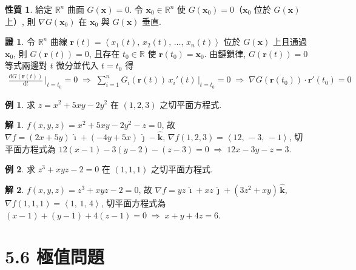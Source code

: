 \documentclass[12pt]{extarticle}
\newcommand{\ds}{\displaystyle}
\newcommand{\ie}{\;\Longrightarrow\;}
\newcommand{\llt}{\left\langle}
\newcommand{\rgt}{\right\rangle}
\theoremstyle{definition}
\newtheorem*{prp}{性質}
\newtheorem*{ex}{例}
\newtheorem*{sol}{解}
\newtheorem*{prf}{證}
\newcommand{\vr}{\mathbf{r}}
\newcommand{\vx}{\mathbf{x}}
\newcommand{\hi}{\widehat{\pmb{\imath}}}
\newcommand{\hj}{\widehat{\pmb{\jmath}}}
\newcommand{\hk}{\widehat{\mathbf{k}}}
\newcommand{\diff}[2]{\frac{\mathrm{d} #1}{\mathrm{d} #2}}
\begin{document}
\begin{prp}
  給定 $\mathbb{R}^n$ 曲面 $\ds G(\vx) = 0$. 令 $\ds\vx_0\in\mathbb{R}^n$ 使 $\ds G(\vx_0) = 0$（$\ds\vx_0$ 位於 $\ds G(\vx)$ 上）, 則 $\nabla G(\vx_0)$ 在 $\vx_0$ 與 $\ds G(\vx)$ 垂直.  
\end{prp}

\begin{prf}
  令 $\mathbb{R}^n$ 曲線 $\ds\vr(t) = \llt x_1(t),\,x_2(t),\,\ldots,\,x_n(t)\rgt$ 位於 $\ds G(\vx)$ 上且通過 $\ds\vx_0$, 則 $\ds G(\vr(t)) = 0$, 且存在 $t_0\in\mathbb{R}$ 使 $\ds\vr(t_0) = \vx_0$. 由鏈鎖律, $\ds G(\vr(t)) = 0$ 等式兩邊對 $t$ 微分並代入 $t = t_0$ 得 
  \begin{align*}
    \diff{G(\vr(t))}{t}\,\bigg|_{t = t_0} = 0 \ie \sum_{i=1}^n G_i(\vr(t))\,x_i'(t)\,\bigg|_{t = t_0} = 0 \ie \nabla G(\vr(t_0))\cdot\vr'(t_0) = 0
  \end{align*}
\end{prf}

\begin{ex}
  求 $z = x^2 + 5xy - 2y^2$ 在 $(1, 2, 3)$ 之切平面方程式. 
\end{ex}

\begin{sol}
  $\ds f(x, y, z) = x^2 + 5xy - 2y^2 - z = 0$, 故 $\nabla f = (2x + 5y)\,\hi + (-4y + 5x)\,\hj - \hk$, $\nabla f(1, 2, 3) = \llt12,\,-3,\,-1\rgt$, 切平面方程式為 $12(x - 1) - 3(y - 2) - (z - 3) = 0 \ie 12 x - 3y - z = 3$. 
\end{sol}

\begin{ex}
  求 $z^3 + xyz - 2 = 0$ 在 $(1, 1, 1)$ 之切平面方程式. 
\end{ex}

\begin{sol}
  $\ds f(x, y, z) = z^3 + xyz - 2 = 0$, 故 $\nabla f = yz\,\hi + xz\,\hj + (3z^2 + xy)\,\hk$, $\nabla f(1, 1, 1) = \llt 1,\, 1,\, 4\rgt$, 切平面方程式為 $(x - 1) + (y - 1) + 4(z - 1) = 0 \ie x + y + 4z = 6$. 
\end{sol}

\section*{5.6 極值問題}
\end{document}
